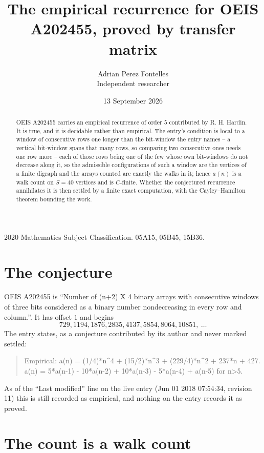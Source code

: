 \documentclass[11pt,a4paper]{article}
\title{The empirical recurrence for OEIS A202455, proved by transfer matrix}
\author{Adrian Perez Fontelles\\ \small Independent researcher}
\date{13 September 2026}
\theoremstyle{plain}
\theoremstyle{definition}
\begin{document}
\maketitle

\begin{abstract}
OEIS A202455 carries an empirical recurrence of order $5$ contributed by R. H. Hardin. It is
true, and it is decidable rather than empirical. The entry's condition is local to a window of consecutive rows one longer than the bit-window the entry names -- a vertical bit-window spans that many rows, so comparing two consecutive ones needs one row more -- each of those rows being one of the few whose own bit-windows do not decrease along it, so
the admissible configurations of such a window are the vertices of a finite digraph and the
arrays counted are exactly the walks in it; hence $a(n)$ is a walk count on $S=40$ vertices
and is $C$-finite. Whether the conjectured recurrence annihilates it is then settled by a
finite exact computation, with the Cayley--Hamilton theorem bounding the work.
\end{abstract}

\noindent\small 2020 Mathematics Subject Classification. 05A15, 05B45, 15B36.\normalsize

\section{The conjecture}

OEIS A202455 is ``Number of (n+2) X 4 binary arrays with consecutive windows of three bits considered as a binary number nondecreasing in every row and column.''. It has offset $1$ and begins
\[
729, 1194, 1876, 2835, 4137, 5854, 8064, 10851,\ \dots
\]
The entry states, as a conjecture contributed by its author and never marked settled:
\begin{quote}
Empirical: a(n) = (1/4)*n\^{}4 + (15/2)*n\^{}3 + (229/4)*n\^{}2 + 237*n + 427. a(n) = 5*a(n-1) - 10*a(n-2) + 10*a(n-3) - 5*a(n-4) + a(n-5) for n>5.
\end{quote}
As of the ``Last modified'' line on the live entry (Jun 01 2018 07:54:34, revision 11) this is still
recorded as empirical, and nothing on the entry records it as proved.

\section{The count is a walk count}
\end{document}
